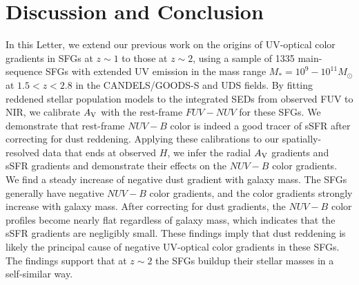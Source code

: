 \documentclass[twocolumn]{aastex61}
\begin{document}
\section{Discussion and Conclusion}

In this Letter, we extend our previous work on the origins of UV-optical 
color gradients in SFGs at $z\sim1$ \citep[][]{Liu16} to those at $z\sim2$, 
using a sample of 1335 main-sequence SFGs with 
extended UV emission in the mass range $M_{\ast} = 10^{9}-10^{11}M_{\odot}$ 
at $1.5<z<2.8$ in the CANDELS/GOODS-S and UDS fields. 
%
By fitting reddened stellar population models to 
the integrated SEDs from observed FUV to NIR, 
we calibrate $A_{\rm V}$ with the rest-frame $FUV-NUV$ for these SFGs. 
We demonstrate that rest-frame $NUV-B$ color is indeed a good 
tracer of sSFR after correcting for dust reddening. 
Applying these calibrations to our spatially-resolved data that ends at observed $H$, 
we infer the radial $A_{\rm V}$ gradients and sSFR gradients and demonstrate 
their effects on the $NUV-B$ color gradients. 
%
We find a steady increase of negative dust gradient with galaxy mass. The SFGs generally have negative $NUV-B$ 
color gradients, and the color gradients strongly increase with galaxy mass.
After correcting for dust gradients, the $NUV-B$ color profiles become nearly flat 
regardless of galaxy mass, which indicates that the sSFR gradients are negligibly small. 
%
These findings imply that dust reddening is likely the principal cause of negative UV-optical 
color gradients in these SFGs. The findings support that 
at $z\sim2$ the SFGs buildup their stellar masses in a self-similar way. 

\end{document}

